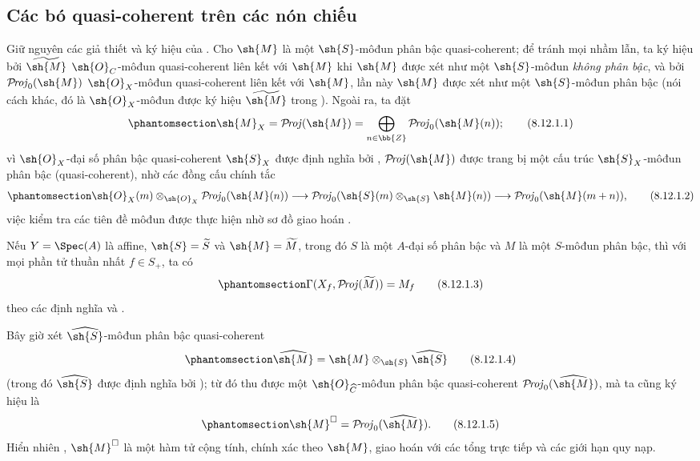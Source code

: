 \documentclass[oneside,10pt]{amsart}
\makeatletter
\newcommand{\ega@arrow}[2]{\mathchoice{#1}{#2}{#2}{#2}}
\renewcommand{\to}{\ega@arrow{\longrightarrow}{\rightarrow}}
\def\shProj{\mathcal{P}\!\mathit{roj}}
\newcommand{\oldpage}[2][]{\marginnote{\normalfont\footnotesize\textbf{#1}~|~#2}\ignorespaces}
\let\EGAOriginalLabel\label
\renewcommand{\label}[1]{\phantomsection\EGAOriginalLabel{#1}}
\makeatother
\begin{document}
\subsection{Các bó quasi-coherent trên các nón chiếu}
\label{subsection:II.8.12}

\begin{env}[8.12.1]
\label{II.8.12.1}
Giữ nguyên các giả thiết và ký hiệu của .
Cho $\sh{M}$ là một $\sh{S}$-môđun phân bậc quasi-coherent;
để tránh mọi nhầm lẫn, ta ký hiệu bởi $\widetilde{\sh{M}}$ $\sh{O}_C$-môđun
\oldpage[II]{192}
quasi-coherent liên kết với $\sh{M}$  khi $\sh{M}$ được xét như một $\sh{S}$-môđun \emph{không phân bậc}, và bởi $\shProj_0(\sh{M})$ $\sh{O}_X$-môđun quasi-coherent liên kết với $\sh{M}$, lần này $\sh{M}$ được xét như một $\sh{S}$-môđun phân bậc (nói cách khác, đó là $\sh{O}_X$-môđun được ký hiệu $\widetilde{\sh{M}}$ trong ).
Ngoài ra, ta đặt
\[
\label{II.8.12.1.1}
  \sh{M}_X=\shProj(\sh{M})
  =\bigoplus_{n\in\bb{Z}}\shProj_0(\sh{M}(n));
\tag{8.12.1.1}
\]
vì $\sh{O}_X$-đại số phân bậc quasi-coherent $\sh{S}_X$ được định nghĩa bởi , $\shProj(\sh{M})$ được trang bị một cấu trúc $\sh{S}_X$-môđun phân bậc (quasi-coherent), nhờ các đồng cấu chính tắc 
\[
\label{II.8.12.1.2}
  \sh{O}_X(m)\otimes_{\sh{O}_X}
  \shProj_0(\sh{M}(n))
  \to \shProj_0(\sh{S}(m)\otimes_{\sh{S}}\sh{M}(n))
  \to \shProj_0(\sh{M}(m+n)),
\tag{8.12.1.2}
\]
việc kiểm tra các tiên đề môđun được thực hiện nhờ sơ đồ giao hoán .

Nếu $Y=\Spec(A)$ là affine, $\sh{S}=\widetilde{S}$ và $\sh{M}=\widetilde{M}$, trong đó $S$ là một $A$-đại số phân bậc và $M$ là một $S$-môđun phân bậc, thì với mọi phần tử thuần nhất $f\in S_+$, ta có
\[
\label{II.8.12.1.3}
  \Gamma(X_f,\shProj(\widetilde{M}))=M_f
\tag{8.12.1.3}
\]
theo các định nghĩa và .

Bây giờ xét $\widehat{\sh{S}}$-môđun phân bậc quasi-coherent
\[
\label{II.8.12.1.4}
  \widehat{\sh{M}}
  =\sh{M}\otimes_{\sh{S}}\widehat{\sh{S}}
\tag{8.12.1.4}
\]
(trong đó $\widehat{\sh{S}}$ được định nghĩa bởi );
từ đó thu được một $\sh{O}_{\widehat{C}}$-môđun phân bậc quasi-coherent $\shProj_0(\widehat{\sh{M}})$, mà ta cũng ký hiệu là
\[
\label{II.8.12.1.5}
  \sh{M}^{\square}=\shProj_0(\widehat{\sh{M}}).
\tag{8.12.1.5}
\]
Hiển nhiên , $\sh{M}^{\square}$ là một hàm tử cộng tính, chính xác theo $\sh{M}$, giao hoán với các tổng trực tiếp và các giới hạn quy nạp.
\end{env}
\end{document}

